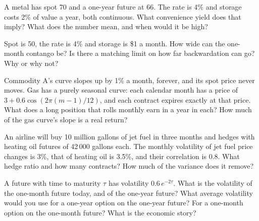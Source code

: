 \begin{question}\label{iq:iv2:commodities-and-energy:6}
A metal has spot 70 and a one-year future at 66. The rate is 4\% and storage costs 2\% of value a year, both continuous. What convenience yield does that imply? What does the number mean, and when would it be high?
\end{question}

\begin{question}\label{iq:iv2:commodities-and-energy:7}
Spot is 50, the rate is 4\% and storage is \$1 a month. How wide can the one-month contango be? Is there a matching limit on how far backwardation can go? Why or why not?
\end{question}

\begin{question}\label{iq:iv2:commodities-and-energy:8}
Commodity A's curve slopes up by 1\% a month, forever, and its spot price never moves. Gas has a purely seasonal curve: each calendar month has a price of $3 + 0.6\cos(2\pi(m - 1)/12)$, and each contract expires exactly at that price. What does a long position that rolls monthly earn in a year in each? How much of the gas curve's slope is a real return?
\end{question}

\begin{question}\label{iq:iv2:commodities-and-energy:9}
An airline will buy 10 million gallons of jet fuel in three months and hedges with heating oil futures of 42\,000 gallons each. The monthly volatility of jet fuel price changes is 3\%, that of heating oil is 3.5\%, and their correlation is 0.8. What hedge ratio and how many contracts? How much of the variance does it remove?
\end{question}

\begin{question}\label{iq:iv2:commodities-and-energy:10}
A future with time to maturity $\tau$ has volatility $0.6\,e^{-2\tau}$. What is the volatility of the one-month future today, and of the one-year future? What average volatility would you use for a one-year option on the one-year future? For a one-month option on the one-month future? What is the economic story?
\end{question}

